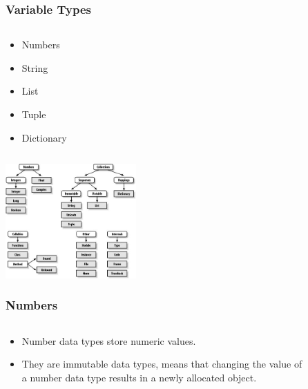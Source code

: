 \documentclass{beamer}
\begin{document}
\begin{frame}
	\frametitle{Variable Types}
	\begin{columns}[c]
		\begin{column}{30cm}
			\vspace{.1cm}
			\begin{itemize}
				\justifying
				\item Numbers
				\item String
				\item List
				\item Tuple
				\item Dictionary
			\end{itemize}
		\end{column}
	\end{columns}
	\vspace{.5cm}
	\hspace*{5.5cm} \includegraphics[width=5cm]{figs/python-types.jpg}
\end{frame}

\begin{frame}
	\frametitle{Numbers}
	\begin{columns}[c]
		\begin{column}{30cm}
			\vspace{.1cm}
			\begin{itemize}
				\justifying
				\item Number data types store numeric values.
				\item They are immutable data types, means that changing the value of \\
				 a number data type results in a newly allocated object.
			\end{itemize}
		\end{column}
	\end{columns}
\end{frame}
\end{document}
